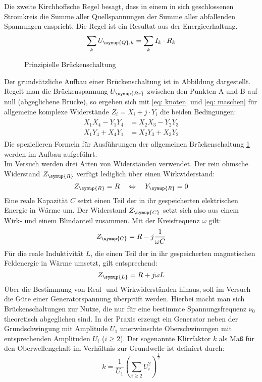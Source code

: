Die zweite Kirchhoffsche Regel besagt, dass in einem in sich geschlossenen Stromkreis
die Summe aller Quellspannungen der Summe aller abfallenden
Spannungen enspricht. Die Regel ist ein Resultat aus der Energieerhaltung.
\begin{equation}
  \sum_k U_{\symup{Q},k} = \sum_k I_k \cdot R_k
  \label{eq: maschen}
\end{equation}
\begin{figure}
  \centering
  \caption{Prinzipielle Brückenschaltung\cite{anleitung302}}
  \label{fig: prinzbrücke}
\end{figure}
Der grundsätzliche Aufbau einer Brückenschaltung ist in Abbildung  dargestellt. Regelt man die Brückenspannung $U_{\symup{Br}}$
zwischen den Punkten A und B auf null (abgeglichene Brücke), so ergeben sich mit \eqref{eq: knoten} und \eqref{eq: maschen}
für allgemeine komplexe Widerstände $Z_i = X_i + j \cdot Y_i$ die
beiden Bedingungen:
\begin{align}
  \begin{aligned}
    X_1 X_4 - Y_1 Y_4 &= X_2 X_3 - Y_2 Y_3 \\
    X_1 Y_4 + X_4 Y_1 &= X_2 Y_3 + X_3 Y_2
  \end{aligned}
  \label{eq: widerstandsbedingungen}
\end{align}
Die spezielleren Formeln für Ausführungen der allgemeinen Brückenschaltung \ref{fig: prinzbrücke} werden im Aufbau aufgeführt.\\
Im Versuch werden drei Arten von Widerständen verwendet. Der rein ohmsche Widerstand
$Z_{\symup{R}}$ verfügt lediglich über einen Wirkwiderstand:
\begin{equation}
 Z_{\symup{R}} = R \quad \Leftrightarrow \quad Y_{\symup{R}} = 0
\end{equation}
Eine reale Kapazität $C$ setzt einen Teil der in ihr gespeicherten elektrischen Energie
in Wärme um. Der Widerstand $Z_{\symup{C}}$ setzt sich also aus einem Wirk- und einem Blindanteil zusammen. Mit der Kreisfrequenz $\omega$ gilt:
\begin{equation}
  Z_{\symup{C}} = R - j \frac{1}{\omega C}
\end{equation}
Für die reale Induktivität $L$, die einen Teil der in ihr
gespeicherten magnetischen Feldenergie in Wärme umsetzt, gilt entsprechend:
\begin{equation}
  Z_{\symup{L}} = R + j \omega L
\end{equation}
Über die Bestimmung von Real- und Wirkwiderständen hinaus, soll im Versuch die Güte einer Generatorspannung überprüft werden. Hierbei
macht man sich Brückenschaltungen zur Nutze, die nur für eine bestimmte Spannungsfrequenz $\nu_0$ theoretisch abgeglichen sind. In der
Praxis erzeugt ein Generator neben der Grundschwingung mit Amplitude $U_1$ unerwünschte Oberschwinungen mit entsprechenden
Amplituden $U_i$ ($i\ge 2$). Der sogenannte Klirrfaktor $k$ als Maß für den Oberwellengehalt im Verhältnis zur Grundwelle ist definiert durch:
\begin{equation}
  k = \frac{1}{U_1} \left( \sum_{i\ge2} U_i ^2 \right) ^{\frac{1}{2}}
  \label{eq: klirr}
\end{equation}
